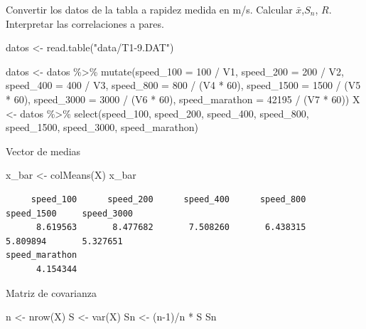 \documentclass[
]{article}
\newenvironment{Shaded}{\begin{snugshade}}{\end{snugshade}}
\newcommand{\AttributeTok}[1]{\textcolor[rgb]{0.77,0.63,0.00}{#1}}
\newcommand{\DecValTok}[1]{\textcolor[rgb]{0.00,0.00,0.81}{#1}}
\newcommand{\FunctionTok}[1]{\textcolor[rgb]{0.00,0.00,0.00}{#1}}
\newcommand{\NormalTok}[1]{#1}
\newcommand{\OtherTok}[1]{\textcolor[rgb]{0.56,0.35,0.01}{#1}}
\newcommand{\SpecialCharTok}[1]{\textcolor[rgb]{0.00,0.00,0.00}{#1}}
\newcommand{\StringTok}[1]{\textcolor[rgb]{0.31,0.60,0.02}{#1}}
\begin{document}
Convertir los datos de la tabla a rapidez medida en m/s. Calcular
\(\bar{x}\),\(S_n\), \(R\). Interpretar las correlaciones a pares.

\begin{Shaded}
\begin{Highlighting}[]
\NormalTok{datos }\OtherTok{\textless{}{-}} \FunctionTok{read.table}\NormalTok{(}\StringTok{"data/T1{-}9.DAT"}\NormalTok{)}

\NormalTok{datos }\OtherTok{\textless{}{-}}\NormalTok{ datos }\SpecialCharTok{\%\textgreater{}\%} \FunctionTok{mutate}\NormalTok{(}\AttributeTok{speed\_100 =} \DecValTok{100} \SpecialCharTok{/}\NormalTok{ V1, }\AttributeTok{speed\_200 =} \DecValTok{200} \SpecialCharTok{/}\NormalTok{ V2,}
\AttributeTok{speed\_400 =} \DecValTok{400} \SpecialCharTok{/}\NormalTok{ V3, }\AttributeTok{speed\_800 =} \DecValTok{800} \SpecialCharTok{/}\NormalTok{ (V4 }\SpecialCharTok{*} \DecValTok{60}\NormalTok{),}
\AttributeTok{speed\_1500 =} \DecValTok{1500} \SpecialCharTok{/}\NormalTok{ (V5 }\SpecialCharTok{*} \DecValTok{60}\NormalTok{), }\AttributeTok{speed\_3000 =} \DecValTok{3000} \SpecialCharTok{/}\NormalTok{ (V6 }\SpecialCharTok{*} \DecValTok{60}\NormalTok{),}
\AttributeTok{speed\_marathon =} \DecValTok{42195} \SpecialCharTok{/}\NormalTok{ (V7 }\SpecialCharTok{*} \DecValTok{60}\NormalTok{))}
\NormalTok{X }\OtherTok{\textless{}{-}}\NormalTok{ datos }\SpecialCharTok{\%\textgreater{}\%} \FunctionTok{select}\NormalTok{(speed\_100, speed\_200, speed\_400,}
\NormalTok{speed\_800, speed\_1500, speed\_3000, speed\_marathon)}
\end{Highlighting}
\end{Shaded}

Vector de medias

\begin{Shaded}
\begin{Highlighting}[]
\NormalTok{x\_bar }\OtherTok{\textless{}{-}} \FunctionTok{colMeans}\NormalTok{(X)}
\NormalTok{x\_bar}
\end{Highlighting}
\end{Shaded}

\begin{verbatim}
     speed_100      speed_200      speed_400      speed_800     speed_1500     speed_3000 
      8.619563       8.477682       7.508260       6.438315       5.809894       5.327651 
speed_marathon 
      4.154344 
\end{verbatim}

Matriz de covarianza

\begin{Shaded}
\begin{Highlighting}[]
\NormalTok{n }\OtherTok{\textless{}{-}} \FunctionTok{nrow}\NormalTok{(X)}
\NormalTok{S }\OtherTok{\textless{}{-}} \FunctionTok{var}\NormalTok{(X)}
\NormalTok{Sn }\OtherTok{\textless{}{-}}\NormalTok{ (n}\DecValTok{{-}1}\NormalTok{)}\SpecialCharTok{/}\NormalTok{n }\SpecialCharTok{*}\NormalTok{ S}
\NormalTok{Sn}
\end{Highlighting}
\end{Shaded}
\end{document}
